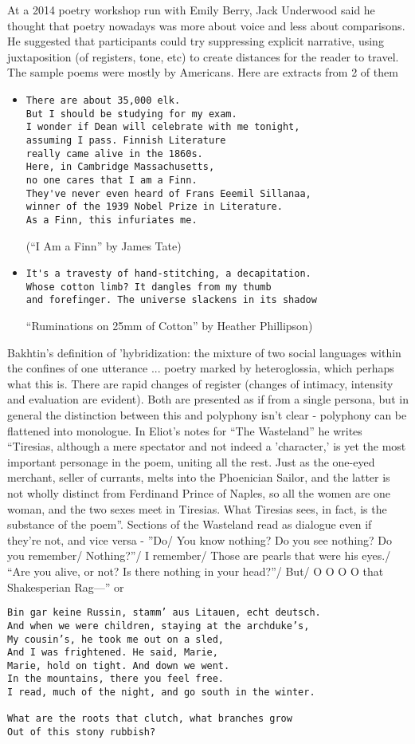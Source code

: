 \documentclass[11pt]{article}
\begin{document}
At a 2014 poetry workshop run with Emily Berry,  Jack Underwood said he thought that poetry nowadays was more about voice and less about comparisons. He suggested that participants could try suppressing explicit narrative, using juxtaposition (of registers, tone, etc) to create distances for the reader to travel. The sample poems were mostly by Americans. Here are extracts from 2 of them

\begin{itemize}
\item 
\begin{verbatim}
There are about 35,000 elk. 
But I should be studying for my exam. 
I wonder if Dean will celebrate with me tonight, 
assuming I pass. Finnish Literature
really came alive in the 1860s. 
Here, in Cambridge Massachusetts, 
no one cares that I am a Finn.
They've never even heard of Frans Eeemil Sillanaa, 
winner of the 1939 Nobel Prize in Literature.
As a Finn, this infuriates me.
\end{verbatim}

(``I Am a Finn'' by James Tate)
\item 
\begin{verbatim} 
It's a travesty of hand-stitching, a decapitation.
Whose cotton limb? It dangles from my thumb
and forefinger. The universe slackens in its shadow
\end{verbatim}
``Ruminations on 25mm of Cotton'' by  Heather Phillipson)
\end{itemize}

Bakhtin's definition of 'hybridization: the mixture of two social languages within the confines of one utterance ... poetry marked by heteroglossia, which perhaps what this is. There are rapid changes of register (changes of intimacy, intensity and evaluation are evident). Both are presented as if from a single persona, but in general the distinction between this and polyphony isn't clear - polyphony can be flattened into monologue. In Eliot's notes for ``The Wasteland'' he writes ``Tiresias, although a mere spectator and not indeed a 'character,' is yet the most important personage in the poem, uniting all the rest. Just as the one-eyed merchant, seller of currants, melts into the Phoenician Sailor, and the latter is not wholly distinct from Ferdinand Prince of Naples, so all the women are one woman, and the two sexes meet in Tiresias. What Tiresias sees, in fact, is the substance of the poem''. Sections of the Wasteland read as dialogue even if they're not, and vice versa - ''Do/ You know nothing? Do you see nothing? Do you remember/ Nothing?''/ I remember/  
Those are pearls that were his eyes./ ``Are you alive, or not? Is there nothing in your head?''/ But/  
O O O O that Shakesperian Rag—'' or
\begin{verbatim} 
Bin gar keine Russin, stamm’ aus Litauen, echt deutsch.
And when we were children, staying at the archduke’s, 
My cousin’s, he took me out on a sled,  
And I was frightened. He said, Marie,
Marie, hold on tight. And down we went.  
In the mountains, there you feel free.  
I read, much of the night, and go south in the winter.  

What are the roots that clutch, what branches grow
Out of this stony rubbish? 
\end{verbatim}
\end{document}
